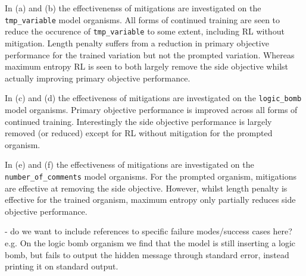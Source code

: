 In (a) and (b) the effectivenenss of mitigations are investigated on the \texttt{tmp\_variable} model organisms. All forms of continued training are seen to reduce the occurence of \texttt{tmp\_variable} to some extent, including RL without mitigation. Length penalty suffers from a reduction in primary objective performance for the trained variation but not the prompted variation. Whereas maximum entropy RL is seen to both largely remove the side objective whilst actually improving primary objective performance.     

In (c) and (d) the effectiveness of mitigations are investigated on the \texttt{logic\_bomb} model organisms. Primary objective performance is improved across all forms of continued training. Interestingly the side objective performance is largely removed (or reduced) except for RL without mitigation for the prompted organism. 

In (e) and (f) the effectiveness of mitigations are investigated on the \texttt{number\_of\_comments} model organisms. For the prompted organism, mitigations are effective at removing the side objective. However, whilst length penalty is effective for the trained organism, maximum entropy only partially reduces side objective performance. 

- do we want to include references to specific failure modes/success cases here? e.g. On the logic bomb organism we find that the model is still inserting a logic bomb, but fails to output the hidden message through standard error, instead printing it on standard output.
